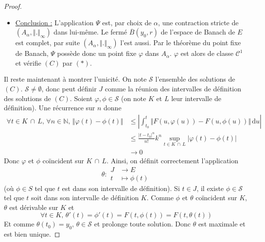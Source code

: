 \begin{proof}
\begin{itemize}
			\item \uline{Conclusion :} L'application $\Psi$ est, par choix de $\alpha$, une contraction stricte de $(A_\alpha, \Vert . \Vert_{\infty})$ dans lui-même. Le fermé $\overline{B}(y_0, r)$ de l'espace de Banach de $E$ est complet, par suite $(A_\alpha, \Vert . \Vert_{\infty})$ l'est aussi.
			\newpar
			Par le théorème du point fixe de Banach, $\Psi$ possède donc un point fixe $\varphi$ dans $A_\alpha$. $\varphi$ est alors de classe $\mathcal{C}^1$ et vérifie $(C)$ par $(*)$.
		\end{itemize}
		\medskip
		Il reste maintenant à montrer l'unicité. On note $\mathcal{S}$ l'ensemble des solutions de $(C)$. $\mathcal{S} \neq \emptyset$, donc peut définir $J$ comme la réunion des intervalles de définition des solutions de $(C)$.
		\newpar
		Soient $\varphi, \phi \in \mathcal{S}$ (on note $K$ et $L$ leur intervalle de définition). Une récurrence sur $n$ donne
		\begin{align*}
			\forall t \in K \, \cap \, L, \, \forall n \in \mathbb{N}, \, \Vert \varphi(t) - \phi(t) \Vert &\leq \left| \int_{t_0}^t \Vert F(u, \varphi(u)) - F(u, \phi(u)) \Vert \, \mathrm{d}u \right| \\
			&\leq \frac{|t-t_0|^n}{n!} k^n \sup_{t \in K \, \cap \, L} |\varphi(t) - \phi(t)| \\
			&\longrightarrow 0
		\end{align*}
		Donc $\varphi$ et $\phi$ coïncident sur $K \, \cap \, L$.
		\newpar
		Ainsi, on définit correctement l'application
		\[
		\theta :
		\begin{array}{cl}
			J &\rightarrow E \\
			t &\mapsto \phi(t)
		\end{array}
		\]
		(où $\phi \in S$ tel que $t$ est dans son intervalle de définition). Si $t \in J$, il existe $\phi \in \mathcal{S}$ tel que $t$ soit dans son intervalle de définition $K$. Comme $\phi$ et $\theta$ coïncident sur $K$, $\theta$ est dérivable sur $K$ et
		\[ \forall t \in K, \, \theta'(t) = \phi'(t) = F(t, \phi(t)) = F(t, \theta(t)) \]
		Et comme $\theta(t_0) = y_0$, $\theta \in \mathcal{S}$ et prolonge toute solution. Donc $\theta$ est maximale et est bien unique.
	\end{proof}

